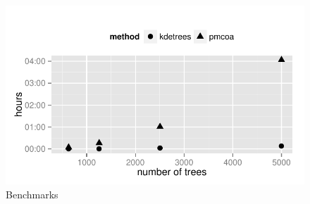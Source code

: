 \documentclass{article}
\begin{document}
\begin{figure}
  \centering
  \includegraphics{img/bench}
  \caption{Benchmarks}
  \label{fig:bench}
\end{figure}






\end{document}
